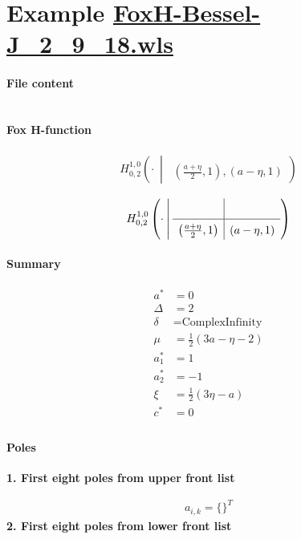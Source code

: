\documentclass[11pt]{article}
\newcommand{\FoxH}[5]{H_{#2}^{#1}\left(#3\:\middle\vert\: \begin{array}{l}#4\\[0.4em] #5\end{array}\right)}
\begin{document}
\section{Example \url{FoxH-Bessel-J_2_9_18.wls}}

\paragraph{File content}

\inputminted{text}{FoxH-Bessel-J_2_9_18.wls}

\paragraph{Fox H-function}

\begin{align*}
  \FoxH
    {1,0}
    {0,2}
    {\cdot}
    {}
    {\left(\frac{a+\eta }{2}, 1\right), \left(a-\eta, 1\right)}
\end{align*}

\begin{align*}
  \FoxHext
    {1,0}
    {0,2}
    {\cdot}
    {}
    {}
    {\left(\frac{a+\eta }{2}, 1\right)}
    {\left(a-\eta, 1\right)}
\end{align*}

\paragraph{Summary}

\begin{align*}
  a^*    & = 0 \\
  \Delta & = 2 \\
  \delta & = \text{ComplexInfinity} \\
  \mu    & = \frac{1}{2} (3 a-\eta -2) \\
  a_1^*  & = 1 \\
  a_2^*  & = -1 \\
  \xi    & = \frac{1}{2} (3 \eta -a) \\
  c^*    & = 0 \\
\end{align*}

\paragraph{Poles}

\noindent\textbf{1. First eight poles from upper front list}

\begin{align*}
  a_{i,k} = 
  \{\}^T 
\end{align*}
\noindent\textbf{2. First eight poles from lower front list}
\end{document}
